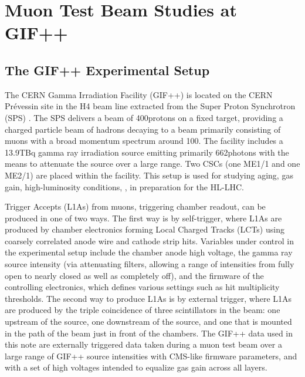 \section{Muon Test Beam Studies at GIF++}
\label{sec:GIF}
\subsection{The GIF++ Experimental Setup}
The CERN Gamma Irradiation Facility (GIF++) is located on the CERN Pr\'{e}vessin site in the H4 beam line extracted from the Super Proton Synchrotron (SPS) \cite{Pfeiffer:2016hnl}. The SPS delivers a beam of 400\GeV protons on a fixed target, providing a charged particle beam of hadrons decaying to a beam primarily consisting of muons with a broad momentum spectrum around 100\GeV. The facility includes a 13.9\unit{TBq}  gamma ray irradiation source emitting primarily 662\keV photons with the means to attenuate the source over a large range. Two CSCs (one ME1/1 and one ME2/1) are placed within the facility. This setup is used for studying aging, gas gain, high-luminosity conditions, \etc, in preparation for the HL-LHC.

\Lone Trigger Accepts (L1As) from muons, triggering chamber readout, can be produced in one of two ways. The first way is by self-trigger, where L1As are produced by chamber electronics forming Local Charged Tracks (LCTs) using coarsely correlated anode wire and cathode strip hits. Variables under control in the experimental setup include the chamber anode high voltage, the gamma ray source intensity (via attenuating filters, allowing a range of intensities from fully open to nearly closed as well as completely off), and the firmware of the controlling electronics, which defines various settings such as hit multiplicity thresholds. The second way to produce L1As is by external trigger, where L1As are produced by the triple coincidence of three scintillators in the beam: one upstream of the source, one downstream of the source, and one that is mounted in the path of the beam just in front of the chambers. The GIF++ data used in this note are externally triggered data taken during a muon test beam over a large range of GIF++ source intensities with CMS-like firmware parameters, and with a set of high voltages intended to equalize gas gain across all layers.


